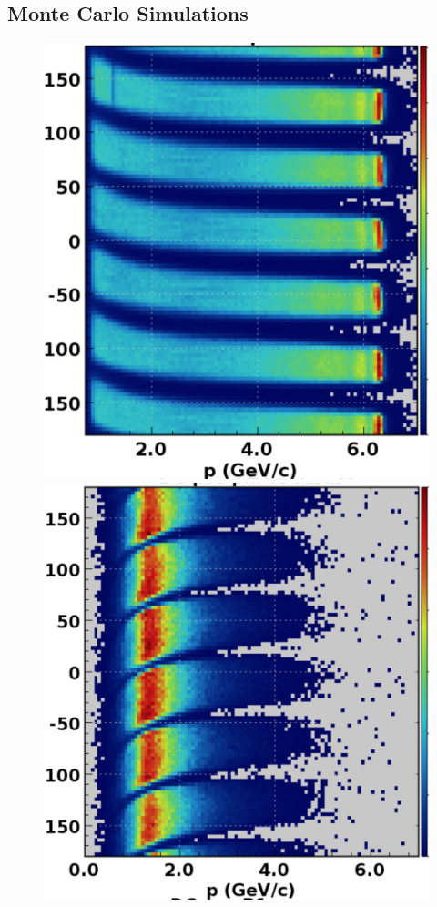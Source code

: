 \documentclass[final,3p,twocolumn]{elsarticle}
\begin{document}
\subsection{Monte Carlo Simulations} 
\begin{figure}[t!]
\centerline{\includegraphics[width=0.9\columnwidth]{neg-tracks.png}}
\vspace{0.3cm}\centerline{\includegraphics[width=0.9\columnwidth]{pos-tracks.png}}

\end{figure}
\end{document}
